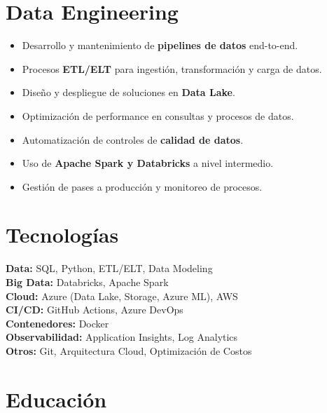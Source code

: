 \documentclass[11pt,a4paper]{article}
\begin{document}
\vspace{6pt}

\section*{Data Engineering}

\begin{itemize}[leftmargin=*]
  \item Desarrollo y mantenimiento de \textbf{pipelines de datos} end-to-end.
  \item Procesos \textbf{ETL/ELT} para ingestión, transformación y carga de datos.
  \item Diseño y despliegue de soluciones en \textbf{Data Lake}.
  \item Optimización de performance en consultas y procesos de datos.
  \item Automatización de controles de \textbf{calidad de datos}.
  \item Uso de \textbf{Apache Spark y Databricks} a nivel intermedio.
  \item Gestión de pases a producción y monitoreo de procesos.
\end{itemize}

\vspace{6pt}

\section*{Tecnologías}

\textbf{Data:} SQL, Python, ETL/ELT, Data Modeling\\
\textbf{Big Data:} Databricks, Apache Spark\\
\textbf{Cloud:} Azure (Data Lake, Storage, Azure ML), AWS\\
\textbf{CI/CD:} GitHub Actions, Azure DevOps\\
\textbf{Contenedores:} Docker\\
\textbf{Observabilidad:} Application Insights, Log Analytics\\
\textbf{Otros:} Git, Arquitectura Cloud, Optimización de Costos

\vspace{6pt}

\section*{Educación}
\end{document}
